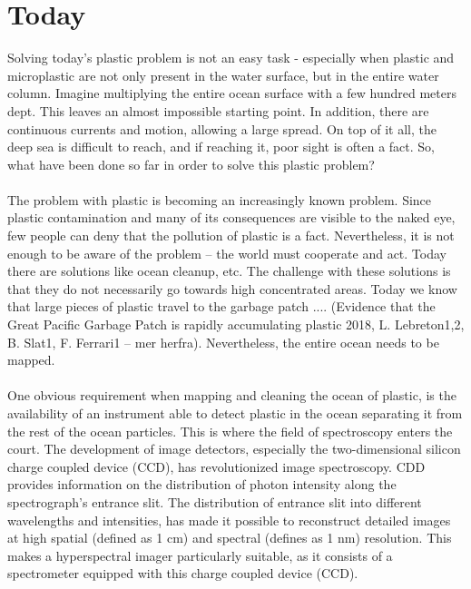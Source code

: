 \section{Today}
Solving today’s plastic problem is not an easy task - especially when plastic and microplastic are not only present in the water surface, but in the entire water column. Imagine multiplying the entire ocean surface with a few hundred meters dept. This leaves an almost impossible starting point. In addition, there are continuous currents and motion, allowing a large spread. On top of it all, the deep sea is difficult to reach, and if reaching it, poor sight is often a fact. So, what have been done so far in order to solve this plastic problem?
\\\\
The problem with plastic is becoming an increasingly known problem. Since plastic contamination and many of its consequences are visible to the naked eye, few people can deny that the pollution of plastic is a fact. Nevertheless, it is not enough to be aware of the problem – the world must cooperate and act. Today there are solutions like ocean cleanup, etc. The challenge with these solutions is that they do not necessarily go towards high concentrated areas. Today we know that large pieces of plastic travel to the garbage patch .... (Evidence that the Great Pacific Garbage Patch is rapidly accumulating plastic 2018, L. Lebreton1,2, B. Slat1, F. Ferrari1 – mer herfra). Nevertheless, the entire ocean needs to be mapped.
\\\\
One obvious requirement when mapping and cleaning the ocean of plastic, is the availability of an instrument able to detect plastic in the ocean separating it from the rest of the ocean particles. This is where the field of spectroscopy enters the court. The development of image detectors, especially the two-dimensional silicon charge coupled device (CCD), has revolutionized image spectroscopy. CDD provides information on the distribution of photon intensity along the spectrograph's entrance slit. The distribution of entrance slit into different wavelengths and intensities, has made it possible to reconstruct detailed images at high spatial (defined as 1 cm) and spectral (defines as 1 nm) resolution. This makes a hyperspectral imager particularly suitable, as it consists of a spectrometer equipped with this charge coupled device (CCD). 

